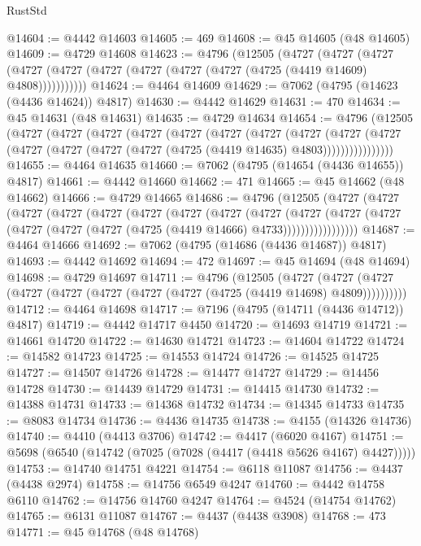 \begin{lexlean}{RustStd}
\begin{coremodule}
@14604 := @4442 @14603
@14605 := 469
@14608 := @45 @14605 (@48 @14605)
@14609 := @4729 @14608
@14623 := @4796
    (@12505
      (@4727
        (@4727
          (@4727 (@4727 (@4727 (@4727 (@4727 (@4727 (@4727 (@4725 (@4419 @14609) @4808)))))))))))
@14624 := @4464 @14609
@14629 := @7062 (@4795 (@14623 (@4436 @14624)) @4817)
@14630 := @4442 @14629
@14631 := 470
@14634 := @45 @14631 (@48 @14631)
@14635 := @4729 @14634
@14654 := @4796
    (@12505
      (@4727
        (@4727
          (@4727
            (@4727
              (@4727
                (@4727
                  (@4727
                    (@4727
                      (@4727
                        (@4727
                          (@4727 (@4727 (@4727 (@4727 (@4725 (@4419 @14635) @4803))))))))))))))))
@14655 := @4464 @14635
@14660 := @7062 (@4795 (@14654 (@4436 @14655)) @4817)
@14661 := @4442 @14660
@14662 := 471
@14665 := @45 @14662 (@48 @14662)
@14666 := @4729 @14665
@14686 := @4796
    (@12505
      (@4727
        (@4727
          (@4727
            (@4727
              (@4727
                (@4727
                  (@4727
                    (@4727
                      (@4727
                        (@4727
                          (@4727
                            (@4727 (@4727 (@4727 (@4727 (@4725 (@4419 @14666) @4733)))))))))))))))))
@14687 := @4464 @14666
@14692 := @7062 (@4795 (@14686 (@4436 @14687)) @4817)
@14693 := @4442 @14692
@14694 := 472
@14697 := @45 @14694 (@48 @14694)
@14698 := @4729 @14697
@14711 := @4796
    (@12505
      (@4727 (@4727 (@4727 (@4727 (@4727 (@4727 (@4727 (@4727 (@4725 (@4419 @14698) @4809))))))))))
@14712 := @4464 @14698
@14717 := @7196 (@4795 (@14711 (@4436 @14712)) @4817)
@14719 := @4442 @14717 @4450
@14720 := @14693 @14719
@14721 := @14661 @14720
@14722 := @14630 @14721
@14723 := @14604 @14722
@14724 := @14582 @14723
@14725 := @14553 @14724
@14726 := @14525 @14725
@14727 := @14507 @14726
@14728 := @14477 @14727
@14729 := @14456 @14728
@14730 := @14439 @14729
@14731 := @14415 @14730
@14732 := @14388 @14731
@14733 := @14368 @14732
@14734 := @14345 @14733
@14735 := @8083 @14734
@14736 := @4436 @14735
@14738 := @4155 (@14326 @14736)
@14740 := @4410 (@4413 @3706)
@14742 := @4417 (@6020 @4167)
@14751 := @5698 (@6540 (@14742 (@7025 (@7028 (@4417 (@4418 @5626 @4167) @4427)))))
@14753 := @14740 @14751 @4221
@14754 := @6118 @11087
@14756 := @4437 (@4438 @2974)
@14758 := @14756 @6549 @4247
@14760 := @4442 @14758 @6110
@14762 := @14756 @14760 @4247
@14764 := @4524 (@14754 @14762)
@14765 := @6131 @11087
@14767 := @4437 (@4438 @3908)
@14768 := 473
@14771 := @45 @14768 (@48 @14768)

\end{coremodule}
\end{lexlean}
